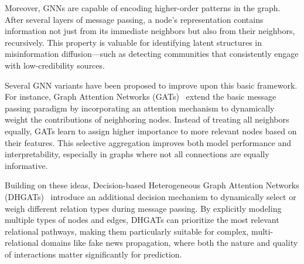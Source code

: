 Moreover, GNNs are capable of encoding higher-order patterns in the graph. After several layers of message passing, a node's representation contains information not just from its immediate neighbors but also from their neighbors, recursively. This property is valuable for identifying latent structures in misinformation diffusion—such as detecting communities that consistently engage with low-credibility sources.

Several GNN variants have been proposed to improve upon this basic framework. For instance, Graph Attention Networks (GATs)~\cite{Velickovic2018} extend the basic message passing paradigm by incorporating an attention mechanism to dynamically weight the contributions of neighboring nodes. Instead of treating all neighbors equally, GATs learn to assign higher importance to more relevant nodes based on their features. This selective aggregation improves both model performance and interpretability, especially in graphs where not all connections are equally informative.

Building on these ideas, Decision-based Heterogeneous Graph Attention Networks (DHGATs)~\cite{Lakzaei2025} introduce an additional decision mechanism to dynamically select or weigh different relation types during message passing. By explicitly modeling multiple types of nodes and edges, DHGATs can prioritize the most relevant relational pathways, making them particularly suitable for complex, multi-relational domains like fake news propagation, where both the nature and quality of interactions matter significantly for prediction.
